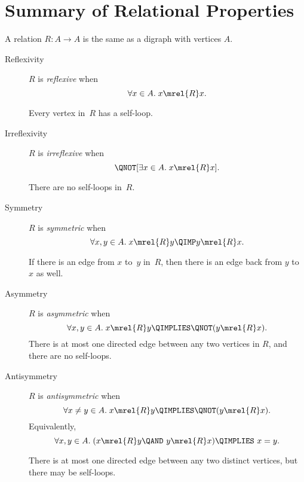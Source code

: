 \section{Summary of Relational Properties}\label{prop_summary_sec}

A relation $R: A \to A$ is the same as a digraph with vertices $A$.

\begin{description}

\item[Reflexivity]

$R$ is \emph{reflexive}%
when
\[
\forall x \in A. \; x \mrel{R} x.
\]


Every vertex in~$R$ has a self-loop.

\item[Irreflexivity]

$R$ is \emph{irreflexive}%
when
\[
\QNOT[ \exists x \in A. \; x \mrel{R} x].
\]


There are no self-loops in~$R$.

\item[Symmetry]

$R$ is \emph{symmetric}%
when
\[
\forall x, y \in A. \; x \mrel{R} y \QIMP y \mrel{R} x.
\]


If there is an edge from $x$ to~$y$ in~$R$, then there is an edge back
from $y$ to~$x$ as well.

\item[Asymmetry]
$R$ is \emph{asymmetric}%
when
\[
\forall x, y \in A. \; x \mrel{R} y \QIMPLIES \QNOT( y \mrel{R} x ).
\]
There is at most one directed edge between any two vertices in $R$,
and there are no self-loops.

\item[Antisymmetry]
$R$ is \emph{antisymmetric}%
when
\[
\forall x \neq y \in A. \; x \mrel{R} y \QIMPLIES \QNOT( y \mrel{R} x ).
\]
Equivalently,
\[
\forall x, y \in A. \; (x \mrel{R} y \QAND\ y \mrel{R} x ) \QIMPLIES\ x = y.
\]

There is at most one directed edge between any two distinct vertices,
but there may be self-loops.


\end{description}
